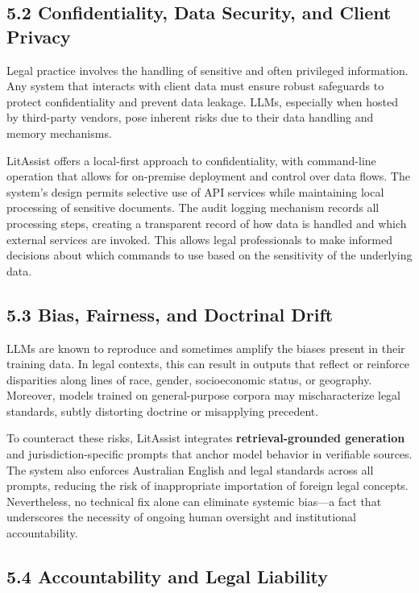 \documentclass[12pt,a4paper]{article}
\begin{document}
\subsection*{5.2 Confidentiality, Data Security, and Client Privacy}

Legal practice involves the handling of sensitive and often privileged information. Any system that interacts with client data must ensure robust safeguards to protect confidentiality and prevent data leakage. LLMs, especially when hosted by third-party vendors, pose inherent risks due to their data handling and memory mechanisms.

LitAssist offers a local-first approach to confidentiality, with command-line operation that allows for on-premise deployment and control over data flows. The system's design permits selective use of API services while maintaining local processing of sensitive documents. The audit logging mechanism records all processing steps, creating a transparent record of how data is handled and which external services are invoked. This allows legal professionals to make informed decisions about which commands to use based on the sensitivity of the underlying data.

\subsection*{5.3 Bias, Fairness, and Doctrinal Drift}

LLMs are known to reproduce and sometimes amplify the biases present in their training data. In legal contexts, this can result in outputs that reflect or reinforce disparities along lines of race, gender, socioeconomic status, or geography. Moreover, models trained on general-purpose corpora may mischaracterize legal standards, subtly distorting doctrine or misapplying precedent.

To counteract these risks, LitAssist integrates \textbf{retrieval-grounded generation} and jurisdiction-specific prompts that anchor model behavior in verifiable sources. The system also enforces Australian English and legal standards across all prompts, reducing the risk of inappropriate importation of foreign legal concepts. Nevertheless, no technical fix alone can eliminate systemic bias—a fact that underscores the necessity of ongoing human oversight and institutional accountability.

\subsection*{5.4 Accountability and Legal Liability}
\end{document}
